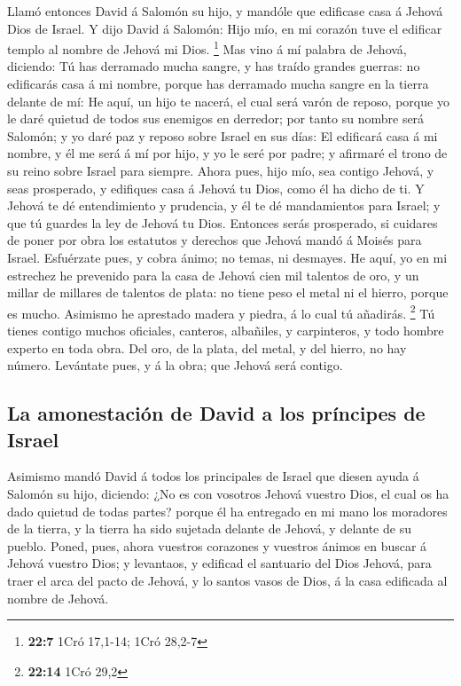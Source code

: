  Llamó entonces David á Salomón su hijo, y mandóle que
edificase casa á Jehová Dios de Israel.  Y dijo David á
Salomón: Hijo mío, en mi corazón tuve el edificar templo al nombre de
Jehová mi Dios. \footnote{\textbf{22:7} 1Cró 17,1-14; 1Cró 28,2-7}
 Mas vino á mí palabra de Jehová, diciendo: Tú has derramado
mucha sangre, y has traído grandes guerras: no edificarás casa á mi
nombre, porque has derramado mucha sangre en la tierra delante de mí:
 He aquí, un hijo te nacerá, el cual será varón de reposo,
porque yo le daré quietud de todos sus enemigos en derredor; por tanto
su nombre será Salomón; y yo daré paz y reposo sobre Israel en sus días:
 El edificará casa á mi nombre, y él me será á mí por hijo,
y yo le seré por padre; y afirmaré el trono de su reino sobre Israel
para siempre.  Ahora pues, hijo mío, sea contigo Jehová, y
seas prosperado, y edifiques casa á Jehová tu Dios, como él ha dicho de
ti.  Y Jehová te dé entendimiento y prudencia, y él te dé
mandamientos para Israel; y que tú guardes la ley de Jehová tu Dios.
 Entonces serás prosperado, si cuidares de poner por obra
los estatutos y derechos que Jehová mandó á Moisés para Israel.
Esfuérzate pues, y cobra ánimo; no temas, ni desmayes.  He
aquí, yo en mi estrechez he prevenido para la casa de Jehová cien mil
talentos de oro, y un millar de millares de talentos de plata: no tiene
peso el metal ni el hierro, porque es mucho. Asimismo he aprestado
madera y piedra, á lo cual tú añadirás. \footnote{\textbf{22:14} 1Cró
  29,2}  Tú tienes contigo muchos oficiales, canteros,
albañiles, y carpinteros, y todo hombre experto en toda obra.
 Del oro, de la plata, del metal, y del hierro, no hay
número. Levántate pues, y á la obra; que Jehová será contigo.

\hypertarget{la-amonestaciuxf3n-de-david-a-los-pruxedncipes-de-israel}{%
\subsection{La amonestación de David a los príncipes de
Israel}\label{la-amonestaciuxf3n-de-david-a-los-pruxedncipes-de-israel}}

 Asimismo mandó David á todos los principales de Israel que
diesen ayuda á Salomón su hijo, diciendo:  ¿No es con
vosotros Jehová vuestro Dios, el cual os ha dado quietud de todas
partes? porque él ha entregado en mi mano los moradores de la tierra, y
la tierra ha sido sujetada delante de Jehová, y delante de su pueblo.
 Poned, pues, ahora vuestros corazones y vuestros ánimos en
buscar á Jehová vuestro Dios; y levantaos, y edificad el santuario del
Dios Jehová, para traer el arca del pacto de Jehová, y lo santos vasos
de Dios, á la casa edificada al nombre de Jehová.

